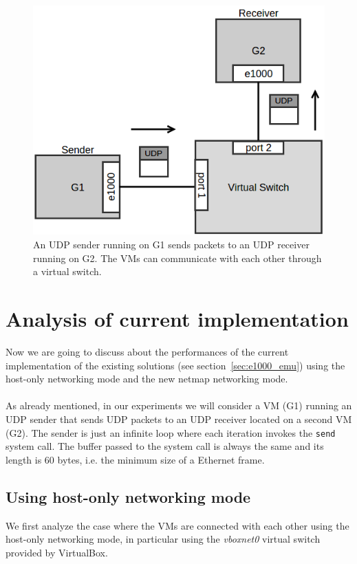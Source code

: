 \documentclass[a4paper, 12pt, titlepage]{report}
\begin{document}
\begin{figure}[!ht]
	\centering
	\includegraphics[scale=0.5]{img/g2g_comm.png}
	\caption{An UDP sender running on G1 sends packets to an UDP receiver running on G2. The VMs can communicate with each other through a virtual switch.}
	\label{img:g2g_comm}
\end{figure}
\section{Analysis of current implementation}
Now we are going to discuss about the performances of the current implementation of the existing solutions (see section~\ref{sec:e1000_emu}) using the host-only networking mode and the new netmap networking mode.
\\
\\
As already mentioned, in our experiments we will consider a VM (G1) running an UDP sender that sends UDP packets to an UDP receiver located on a second VM (G2). The sender is just an infinite loop where each iteration invokes the \texttt{send} system call. The buffer passed to the system call is always the same and its length is 60 bytes, i.e. the minimum size of a Ethernet frame.
\subsection{Using host-only networking mode}
We first analyze the case where the VMs are connected with each other using the host-only networking mode, in particular using the \textit{vboxnet0} virtual switch provided by VirtualBox.
\end{document}
